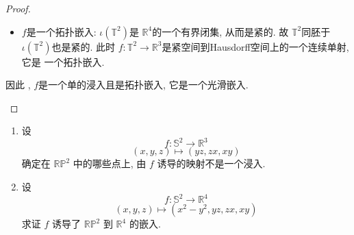 \documentclass[../main.tex]{subfiles}
\begin{document}
\begin{proof}
\begin{enumerate}
\begin{itemize}
\[    \] 若\(  \,\mathrm{d} f_{p}\left( r \right)= 0   \), 则 \[
    \,\mathrm{d} g_{p}\circ \,\mathrm{d} \iota _{p}\left( r \right)= \begin{pmatrix} 
        \left( 2+ x^{3} \right)r^{1}+ x^{1}r^{3}\\ 
         \left( 2+ x^{3} \right)r^{2}+ x^{2}  r^{3}\\ 
          r^{4} 
    \end{pmatrix}  = 0 \tag{*}
    \]此时 \(  r^{4}= 0  \), 从而 \(  x^{3}r^{3}= -x^{4}r^{4}= 0  \).
    \begin{itemize}
      \item 若 \(  x^{3}\neq 0  \) ,则 \(  r^{3}= 0  \), 此时我们得到 \[
      \left( 2+ x^{3} \right)r^{1}= 0, \left( 2+ x^{3} \right)r^{2}= 0  
      \] 由于 \(  \left( x^{3} \right)^{2} < 1\), 从而 \(  2+ x^{3}\neq 0  \), 得到 \(  r^{1}= r^{2}= 0  \).  这表明 当 \(  x^{3}\neq 0  \)时, 我们有 \[
      \,\mathrm{d} f_{p}\left( r \right)= 0\iff r= 0 
      \]即 \(  \,\mathrm{d} f_{p}  \)是一个单射, 从而 \(  f  \)在 \(  p  \)处是一个浸入.    
      \item 若 \(  x^{3}= 0  \), 则 \[
      x^{1}r^{3}= -2r^{1},\quad x^{2}r^{3}= -2r^{2} \implies x^{1}r^{1}r^{3}= -2 \left( r^{1} \right)^{2},  x^{2}r^{2}r^{3}= -2 \left( r^{2} \right)^{2}  
      \] 右侧两式相加, 得到 \[
      0= -2\left( \left( r^{1} \right)^{2}+ \left( r^{2} \right)^{2}   \right) \implies r^{1}= r^{2}= 0
      \]进而 由于 \(  x^{1}  \)和 \(  x^{2}  \)不可能同时为零, 由(*)可知总有 \(  r^{3}= 0  \). 这表明当 \(  x^{3}= 0  \)时, 也有 \[
      \,\mathrm{d} f_{p}\left( r \right)= 0\iff r= 0 
      \]   故 此时 \(  f  \)在 \(  p  \)处也是一个浸入.   
    \end{itemize}
    综上可知, \(  f  \)是一个浸入. 
    \item \(  f  \)是一个拓扑嵌入: \(  \iota \left( \mathbb{T}^{2} \right)   \)是 \(  \mathbb{R} ^{4}  \)的一个有界闭集, 从而是紧的. 故 \(  \mathbb{T}^{2}  \)同胚于 \(  \iota \left( \mathbb{T}^{2} \right)   \)也是紧的. 此时 \(  f: \mathbb{T}^{2}\to \mathbb{R} ^{3}  \)是紧空间到Hausdorff空间上的一个连续单射, 它是 一个拓扑嵌入.  
    \end{itemize}
    因此 , \(  f  \)是一个单的浸入且是拓扑嵌入, 它是一个光滑嵌入. 
  \end{enumerate}
  
\end{proof}
\begin{exercise}{}{}
\begin{enumerate}
\item 设
$$f: \mathbb{S}^2 \to \mathbb{R}^3$$
$$(x,y,z) \mapsto (yz, zx, xy)$$
确定在 $\mathbb{RP}^2$ 中的哪些点上, 由 $f$ 诱导的映射不是一个浸入.
\item 设
$$f: \mathbb{S}^2 \to \mathbb{R}^4$$
$$(x,y,z) \mapsto (x^2-y^2, yz, zx, xy)$$
求证 $f$ 诱导了 $\mathbb{RP}^2$ 到 $\mathbb{R}^4$ 的嵌入.
\end{enumerate}
\end{exercise}
\end{document}

